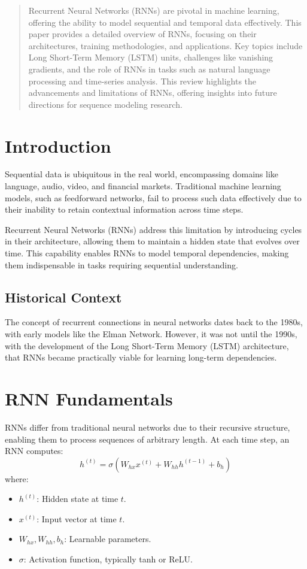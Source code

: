 

\maketitle

\begin{abstract}
Recurrent Neural Networks (RNNs) are pivotal in machine learning, offering the ability to model sequential and temporal data effectively. This paper provides a detailed overview of RNNs, focusing on their architectures, training methodologies, and applications. Key topics include Long Short-Term Memory (LSTM) units, challenges like vanishing gradients, and the role of RNNs in tasks such as natural language processing and time-series analysis. This review highlights the advancements and limitations of RNNs, offering insights into future directions for sequence modeling research.
\end{abstract}


\section{Introduction}
Sequential data is ubiquitous in the real world, encompassing domains like language, audio, video, and financial markets. Traditional machine learning models, such as feedforward networks, fail to process such data effectively due to their inability to retain contextual information across time steps.

Recurrent Neural Networks (RNNs) address this limitation by introducing cycles in their architecture, allowing them to maintain a hidden state that evolves over time. This capability enables RNNs to model temporal dependencies, making them indispensable in tasks requiring sequential understanding.

\subsection{Historical Context}
The concept of recurrent connections in neural networks dates back to the 1980s, with early models like the Elman Network. However, it was not until the 1990s, with the development of the Long Short-Term Memory (LSTM) architecture, that RNNs became practically viable for learning long-term dependencies.

\section{RNN Fundamentals}
RNNs differ from traditional neural networks due to their recursive structure, enabling them to process sequences of arbitrary length. At each time step, an RNN computes:
\[
h^{(t)} = \sigma(W_{hx}x^{(t)} + W_{hh}h^{(t-1)} + b_h)
\]
where:
\begin{itemize}
    \item \( h^{(t)} \): Hidden state at time \( t \).
    \item \( x^{(t)} \): Input vector at time \( t \).
    \item \( W_{hx}, W_{hh}, b_h \): Learnable parameters.
    \item \( \sigma \): Activation function, typically tanh or ReLU.
\end{itemize}


